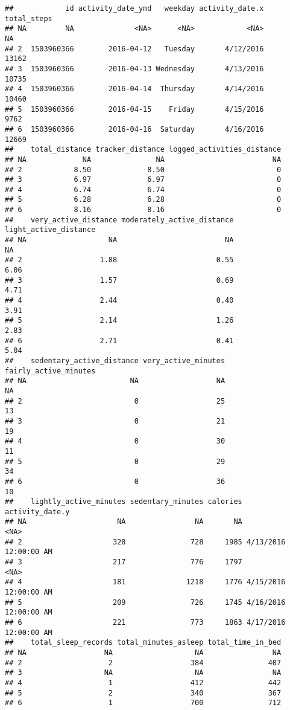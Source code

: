\documentclass[
]{article}
\begin{document}
\begin{verbatim}
##            id activity_date_ymd   weekday activity_date.x total_steps
## NA         NA              <NA>      <NA>            <NA>          NA
## 2  1503960366        2016-04-12   Tuesday       4/12/2016       13162
## 3  1503960366        2016-04-13 Wednesday       4/13/2016       10735
## 4  1503960366        2016-04-14  Thursday       4/14/2016       10460
## 5  1503960366        2016-04-15    Friday       4/15/2016        9762
## 6  1503960366        2016-04-16  Saturday       4/16/2016       12669
##    total_distance tracker_distance logged_activities_distance
## NA             NA               NA                         NA
## 2            8.50             8.50                          0
## 3            6.97             6.97                          0
## 4            6.74             6.74                          0
## 5            6.28             6.28                          0
## 6            8.16             8.16                          0
##    very_active_distance moderately_active_distance light_active_distance
## NA                   NA                         NA                    NA
## 2                  1.88                       0.55                  6.06
## 3                  1.57                       0.69                  4.71
## 4                  2.44                       0.40                  3.91
## 5                  2.14                       1.26                  2.83
## 6                  2.71                       0.41                  5.04
##    sedentary_active_distance very_active_minutes fairly_active_minutes
## NA                        NA                  NA                    NA
## 2                          0                  25                    13
## 3                          0                  21                    19
## 4                          0                  30                    11
## 5                          0                  29                    34
## 6                          0                  36                    10
##    lightly_active_minutes sedentary_minutes calories       activity_date.y
## NA                     NA                NA       NA                  <NA>
## 2                     328               728     1985 4/13/2016 12:00:00 AM
## 3                     217               776     1797                  <NA>
## 4                     181              1218     1776 4/15/2016 12:00:00 AM
## 5                     209               726     1745 4/16/2016 12:00:00 AM
## 6                     221               773     1863 4/17/2016 12:00:00 AM
##    total_sleep_records total_minutes_asleep total_time_in_bed
## NA                  NA                   NA                NA
## 2                    2                  384               407
## 3                   NA                   NA                NA
## 4                    1                  412               442
## 5                    2                  340               367
## 6                    1                  700               712
\end{verbatim}
\end{document}
